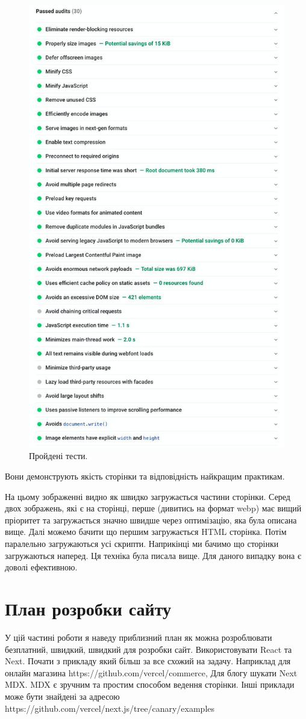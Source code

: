 \begin{figure}
    \includegraphics[width=0.8\linewidth]{../passed_audits.jpg}\par
    \caption{Пройдені тести.}
\end{figure}

Вони демонструють якість сторінки та відповідність найкращим практикам.

На цьому зображенні видно як швидко загружається частини сторінки.
Серед двох зображень, які є на сторінці, перше (дивитись на формат webp) має вищий пріоритет та загружається
значно швидше через оптимізацію, яка була описана вище.
Далі можемо бачити що першим загружається HTML сторінка. Потім паралельно загружаються усі скрипти.
Наприкінці ми бачимо що сторінки загружаються наперед. Ця техніка була писала вище.
Для даного випадку вона є доволі ефективною.

\section{План розробки сайту}
У цій частині роботи я наведу приблизний план як можна розроблювати безплатний, швидкий, швидкий для розробки сайт.
Використовувати React та Next.
Почати з прикладу який більш за все схожий на задачу.
Наприклад для онлайн магазина https://github.com/vercel/commerce,
Для блогу шукати Next MDX. MDX є зручним та простим способом ведення сторінки.
Інші приклади може бути знайдені за адресою \\ https://github.com/vercel/next.js/tree/canary/examples

